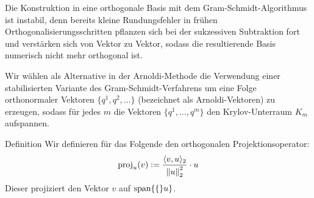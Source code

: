 Die Konstruktion in eine orthogonale Basis mit dem Gram-Schmidt-Algorithmus ist instabil, denn bereits kleine 
Rundungsfehler in frühen Orthogonalisierungsschritten pflanzen sich bei der sukzessiven Subtraktion fort und 
verstärken sich von Vektor zu Vektor, sodass die resultierende Basis numerisch nicht mehr orthogonal ist.

Wir wählen als Alternative in der Arnoldi-Methode die Verwendung einer stabilisierten Variante des 
Gram-Schmidt-Verfahrens um eine Folge orthonormaler Vektoren $\{q^1,q^2,\dots\}$ (bezeichnet als 
Arnoldi-Vektoren) zu erzeugen, sodass für jedes $m$ die Vektoren $\{q^1,\dots,q^m\}$ den Krylov-Unterraum $K_m$ 
aufspannen. 

\begin{colbox}{Definition}
Wir definieren für das Folgende den orthogonalen Projektionsoperator:
%
\begin{align*}
  \text{proj}_u(v) 
  := \dfrac{\langle v,u\rangle_2}{\vertn{2}{u}_2^2}\cdot u
\end{align*}
%
Dieser projiziert den Vektor $v$ auf $\text{span}\{\{\}u\}$.
\end{colbox}

